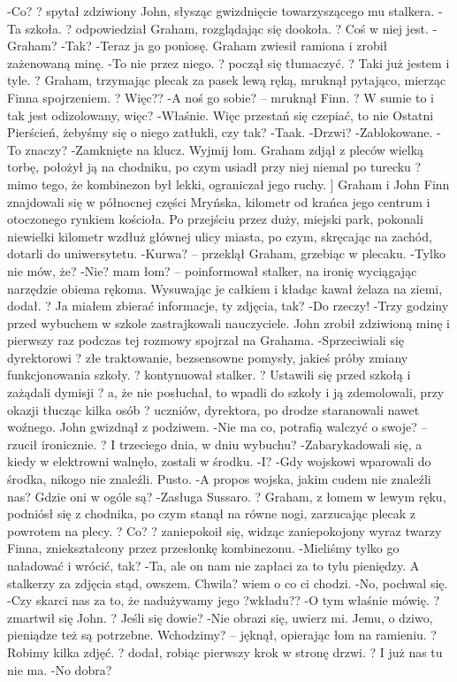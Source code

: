 \documentclass[../MAIN.tex]{subfiles}
\begin{document}
-Co? ? spytał zdziwiony John, słysząc gwizdnięcie towarzyszącego mu stalkera.
-Ta szkoła. ? odpowiedział Graham, rozglądając się dookoła. ? Coś w niej jest.
-Graham?
-Tak?
-Teraz ja go poniosę.
Graham zwiesił ramiona i zrobił zażenowaną minę.
-To nie przez niego. ? począł się tłumaczyć. ? Taki już jestem i tyle. ? Graham, trzymając plecak za pasek lewą ręką, mruknął pytająco, mierząc Finna spojrzeniem. ? Więc??
-A noś go sobie? -- mruknął Finn. ? W sumie to i tak jest odizolowany, więc?
-Właśnie. Więc przestań się czepiać, to nie Ostatni Pierścień, żebyśmy się o niego zatłukli, czy tak?
-Taak.
-Drzwi?
-Zablokowane.
-To znaczy?
-Zamknięte na klucz. Wyjmij łom.
Graham zdjął z pleców wielką torbę, położył ją na chodniku, po czym usiadł przy niej niemal po turecku ? mimo tego, że kombinezon był lekki, ograniczał jego ruchy. ]
Graham i John Finn znajdowali się w północnej części Mryńska, kilometr od krańca jego centrum i otoczonego rynkiem kościoła. Po przejściu przez duży, miejski park, pokonali niewielki kilometr wzdłuż głównej ulicy miasta, po czym, skręcając na zachód, dotarli do uniwersytetu.
-Kurwa? -- przeklął Graham, grzebiąc w plecaku.
-Tylko nie mów, że?
-Nie? mam łom? -- poinformował stalker, na ironię wyciągając narzędzie obiema rękoma. Wysuwając je całkiem i kładąc kawał żelaza na ziemi, dodał. ? Ja miałem zbierać informacje, ty zdjęcia, tak?
-Do rzeczy!
-Trzy godziny przed wybuchem w szkole zastrajkowali nauczyciele.
John zrobił zdziwioną minę i pierwszy raz podczas tej rozmowy spojrzał na Grahama.
-Sprzeciwiali się dyrektorowi ? złe traktowanie, bezsensowne pomysły, jakieś próby zmiany funkcjonowania szkoły. ? kontynuował stalker. ? Ustawili się przed szkołą i zażądali dymisji ? a, że nie posłuchał, to wpadli do szkoły i ją zdemolowali, przy okazji tłucząc kilka osób ? uczniów, dyrektora, po drodze staranowali nawet woźnego.
John gwizdnął z podziwem.
-Nie ma co, potrafią walczyć o swoje? -- rzucił ironicznie. ? I trzeciego dnia, w dniu wybuchu?
-Zabarykadowali się, a kiedy w elektrowni walnęło, zostali w środku.
-I?
-Gdy wojskowi wparowali do środka, nikogo nie znaleźli. Pusto.
-A propos wojska, jakim cudem nie znaleźli nas? Gdzie oni w ogóle są?
-Zasługa Sussaro. ? Graham, z łomem w lewym ręku, podniósł się z chodnika, po czym stanął na równe nogi, zarzucając plecak z powrotem na plecy. ? Co? ? zaniepokoił się, widząc zaniepokojony wyraz twarzy Finna, zniekształcony przez przesłonkę kombinezonu.
-Mieliśmy tylko go naładować i wrócić, tak?
-Ta, ale on nam nie zapłaci za to tylu pieniędzy. A stalkerzy za zdjęcia stąd, owszem. Chwila? wiem o co ci chodzi.
-No, pochwal się.
-Czy skarci nas za to, że nadużywamy jego ?wkładu??
-O tym właśnie mówię. ? zmartwił się John. ? Jeśli się dowie?
-Nie obrazi się, uwierz mi. Jemu, o dziwo, pieniądze też są potrzebne. Wchodzimy? -- jęknął, opierając łom na ramieniu. ? Robimy kilka zdjęć. ? dodał, robiąc pierwszy krok w stronę drzwi. ? I już nas tu nie ma.
-No dobra?
\end{document}
